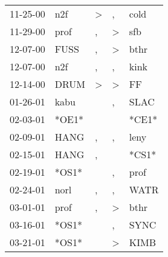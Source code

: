 \begin{supertabular}{p{0.07\textwidth}p{0.06\textwidth}p{0.02\textwidth}p{0.02\textwidth}p{0.06\textwidth}}
          11-25-00\textsuperscript{} &            n2f\textsuperscript{} &     \textgreater &                , &           cold\textsuperscript{} \\
          11-29-00\textsuperscript{} &           prof\textsuperscript{} &                , &     \textgreater &            sfb\textsuperscript{} \\
          12-07-00\textsuperscript{} &           FUSS\textsuperscript{} &                , &     \textgreater &           bthr\textsuperscript{} \\
          12-07-00\textsuperscript{} &            n2f\textsuperscript{} &                , &                , &           kink\textsuperscript{} \\
          12-14-00\textsuperscript{} &           DRUM\textsuperscript{} &     \textgreater &     \textgreater &             FF\textsuperscript{} \\
          01-26-01\textsuperscript{} &           kabu\textsuperscript{} &                  &                , &           SLAC\textsuperscript{} \\
          02-03-01\textsuperscript{} &                            *OE1* &                  &                  &                            *CE1* \\
          02-09-01\textsuperscript{} &           HANG\textsuperscript{} &                , &                , &           leny\textsuperscript{} \\
          02-15-01\textsuperscript{} &           HANG\textsuperscript{} &                , &                  &                            *CS1* \\
          02-19-01\textsuperscript{} &                            *OS1* &                  &                , &           prof\textsuperscript{} \\
          02-24-01\textsuperscript{} &           norl\textsuperscript{} &                , &                , &           WATR\textsuperscript{} \\
          03-01-01\textsuperscript{} &           prof\textsuperscript{} &                , &     \textgreater &           bthr\textsuperscript{} \\
          03-16-01\textsuperscript{} &                            *OS1* &                  &                , &           SYNC\textsuperscript{} \\
          03-21-01\textsuperscript{} &                            *OS1* &                  &     \textgreater &           KIMB\textsuperscript{} \\

\end{supertabular}
